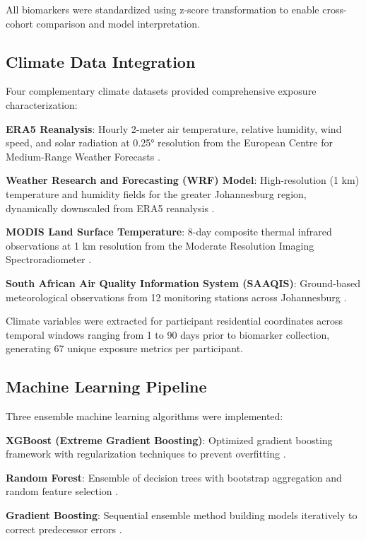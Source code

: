 \documentclass[11pt,a4paper]{article}
\begin{document}
All biomarkers were standardized using z-score transformation to enable cross-cohort comparison and model interpretation.

\subsection{Climate Data Integration}

Four complementary climate datasets provided comprehensive exposure characterization:

\textbf{ERA5 Reanalysis}: Hourly 2-meter air temperature, relative humidity, wind speed, and solar radiation at 0.25° resolution from the European Centre for Medium-Range Weather Forecasts \citep{hersbach2020era5}.

\textbf{Weather Research and Forecasting (WRF) Model}: High-resolution (1 km) temperature and humidity fields for the greater Johannesburg region, dynamically downscaled from ERA5 reanalysis \citep{skamarock2008description}.

\textbf{MODIS Land Surface Temperature}: 8-day composite thermal infrared observations at 1 km resolution from the Moderate Resolution Imaging Spectroradiometer \citep{wan2015modis}.

\textbf{South African Air Quality Information System (SAAQIS)}: Ground-based meteorological observations from 12 monitoring stations across Johannesburg \citep{saaqis2021data}.

Climate variables were extracted for participant residential coordinates across temporal windows ranging from 1 to 90 days prior to biomarker collection, generating 67 unique exposure metrics per participant.

\subsection{Machine Learning Pipeline}

Three ensemble machine learning algorithms were implemented:

\textbf{XGBoost (Extreme Gradient Boosting)}: Optimized gradient boosting framework with regularization techniques to prevent overfitting \citep{chen2016xgboost}.

\textbf{Random Forest}: Ensemble of decision trees with bootstrap aggregation and random feature selection \citep{breiman2001random}.

\textbf{Gradient Boosting}: Sequential ensemble method building models iteratively to correct predecessor errors \citep{friedman2001greedy}.
\end{document}
